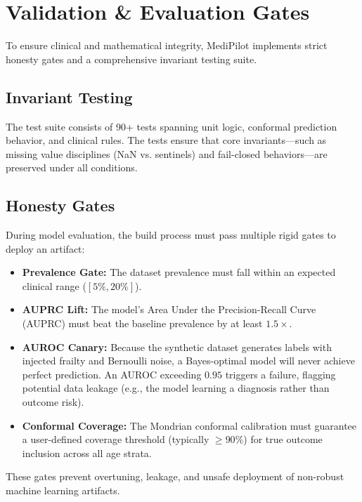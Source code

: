 \section{Validation \& Evaluation Gates}

To ensure clinical and mathematical integrity, MediPilot implements strict honesty gates and a comprehensive invariant testing suite. 

\subsection{Invariant Testing}
The test suite consists of 90+ tests spanning unit logic, conformal prediction behavior, and clinical rules. The tests ensure that core invariants—such as missing value disciplines (NaN vs. sentinels) and fail-closed behaviors—are preserved under all conditions.

\subsection{Honesty Gates}
During model evaluation, the build process must pass multiple rigid gates to deploy an artifact:
\begin{itemize}
    \item \textbf{Prevalence Gate:} The dataset prevalence must fall within an expected clinical range ($[5\%, 20\%]$).
    \item \textbf{AUPRC Lift:} The model’s Area Under the Precision-Recall Curve (AUPRC) must beat the baseline prevalence by at least $1.5\times$.
    \item \textbf{AUROC Canary:} Because the synthetic dataset generates labels with injected frailty and Bernoulli noise, a Bayes-optimal model will never achieve perfect prediction. An AUROC exceeding $0.95$ triggers a failure, flagging potential data leakage (e.g., the model learning a diagnosis rather than outcome risk).
    \item \textbf{Conformal Coverage:} The Mondrian conformal calibration must guarantee a user-defined coverage threshold (typically $\ge 90\%$) for true outcome inclusion across all age strata.
\end{itemize}

These gates prevent overtuning, leakage, and unsafe deployment of non-robust machine learning artifacts.
